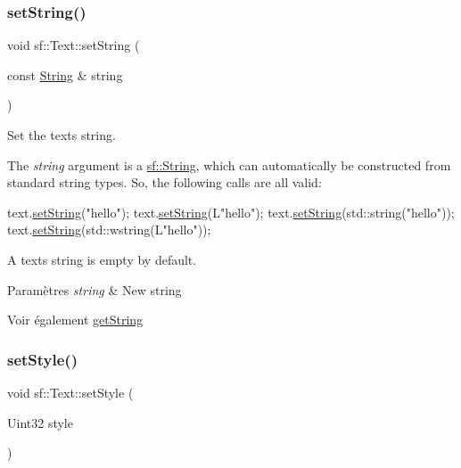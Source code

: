 \subsubsection{\texorpdfstring{set\+String()}{setString()}}
{\footnotesize\ttfamily void sf\+::\+Text\+::set\+String (\begin{DoxyParamCaption}\item[{const \hyperlink{classsf_1_1String}{String} \&}]{string }\end{DoxyParamCaption})}



Set the text\textquotesingle{}s string. 

The {\itshape string} argument is a \hyperlink{classsf_1_1String}{sf\+::\+String}, which can automatically be constructed from standard string types. So, the following calls are all valid\+: 
\begin{DoxyCode}
text.\hyperlink{classsf_1_1Text_a7d3b3359f286fd9503d1ced25b7b6c33}{setString}(\textcolor{stringliteral}{"hello"});
text.\hyperlink{classsf_1_1Text_a7d3b3359f286fd9503d1ced25b7b6c33}{setString}(L\textcolor{stringliteral}{"hello"});
text.\hyperlink{classsf_1_1Text_a7d3b3359f286fd9503d1ced25b7b6c33}{setString}(std::string(\textcolor{stringliteral}{"hello"}));
text.\hyperlink{classsf_1_1Text_a7d3b3359f286fd9503d1ced25b7b6c33}{setString}(std::wstring(L\textcolor{stringliteral}{"hello"}));
\end{DoxyCode}
 A text\textquotesingle{}s string is empty by default.


\begin{DoxyParams}{Paramètres}
{\em string} & New string\\
\hline
\end{DoxyParams}
\begin{DoxySeeAlso}{Voir également}
\hyperlink{classsf_1_1Text_a084c275eb4bca835696af5f8f9c80ab3}{get\+String} 
\end{DoxySeeAlso}
\mbox{\label{classsf_1_1Text_ad791702bc2d1b6590a1719aa60635edf}} 
\subsubsection{\texorpdfstring{set\+Style()}{setStyle()}}
{\footnotesize\ttfamily void sf\+::\+Text\+::set\+Style (\begin{DoxyParamCaption}\item[{Uint32}]{style }\end{DoxyParamCaption})}




